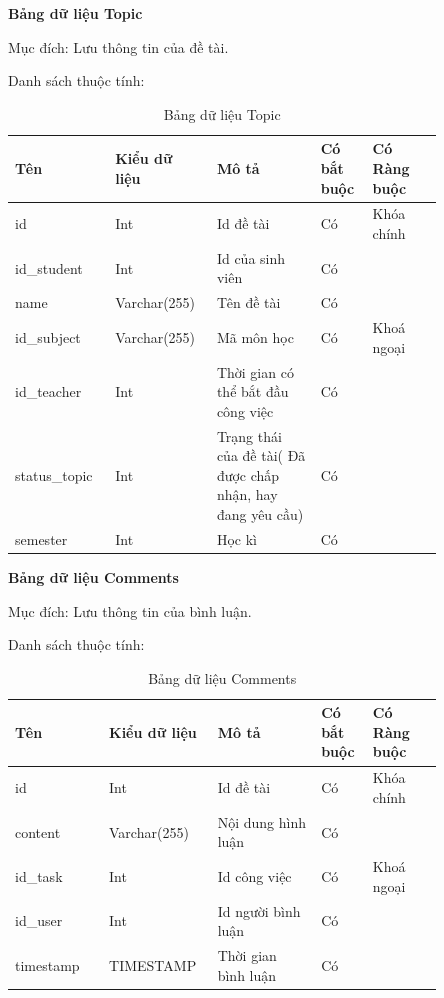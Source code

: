 \documentclass[../Main.tex]{subfiles}
\begin{document}
\textbf{Bảng dữ liệu Topic}

Mục đích: Lưu thông tin của đề tài.

Danh sách thuộc tính:
\begin{table}[H]
\centering
\bgroup
\renewcommand{\arraystretch}{1.5}%
\begin{tabular}{|L{0.2\linewidth}|L{0.18\linewidth}|L{0.22\linewidth}|L{0.1\linewidth}|L{0.15\linewidth}|}
\hline
\textbf{Tên} & \textbf{Kiểu dữ liệu} & \textbf{Mô tả} & \textbf{Có bắt buộc} & \textbf{Có Ràng buộc} \\ \hline
id & Int & Id đề tài & Có & Khóa chính \\ \hline
id\_student & Int & Id của sinh viên & Có &  \\ \hline
name & Varchar(255) & Tên đề tài & Có &  \\ \hline
id\_subject & Varchar(255) & Mã môn học & Có & Khoá ngoại \\ \hline
id\_teacher & Int & Thời gian có thể bắt đầu công việc & Có &  \\ \hline
status\_topic & Int & Trạng thái của đề tài( Đã được chấp nhận, hay đang yêu cầu) & Có &  \\ \hline
semester & Int & Học kì & Có &  \\ \hline
\end{tabular}
\egroup
\caption{Bảng dữ liệu Topic}
\end{table}

\textbf{Bảng dữ liệu Comments}

Mục đích: Lưu thông tin của bình luận.

Danh sách thuộc tính:
\begin{table}[H]
\centering
\bgroup
\renewcommand{\arraystretch}{1.5}%
\begin{tabular}{|L{0.2\linewidth}|L{0.18\linewidth}|L{0.22\linewidth}|L{0.1\linewidth}|L{0.15\linewidth}|}
\hline
\textbf{Tên} & \textbf{Kiểu dữ liệu} & \textbf{Mô tả} & \textbf{Có bắt buộc} & \textbf{Có Ràng buộc} \\ \hline
id & Int & Id đề tài & Có & Khóa chính \\ \hline
content & Varchar(255) & Nội dung hình luận & Có &  \\ \hline
id\_task & Int & Id công việc & Có & Khoá ngoại \\ \hline
id\_user & Int & Id người bình luận & Có &  \\ \hline
timestamp & TIMESTAMP & Thời gian bình luận & Có &  \\ \hline
\end{tabular}
\egroup
\caption{Bảng dữ liệu Comments}
\end{table}
\end{document}
